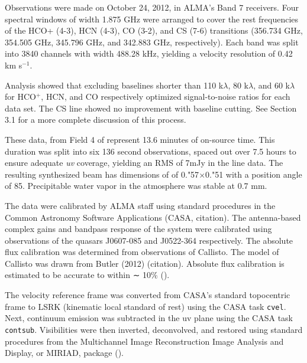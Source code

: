 Observations were made on October 24, 2012, in ALMA's Band 7 receivers. Four spectral windows of width 1.875 GHz were arranged to cover the rest frequencies of the HCO+ (4-3), HCN (4-3), CO (3-2), and CS (7-6) transitions (356.734 GHz, 354.505 GHz, 345.796 GHz, and 342.883 GHz, respectively). Each band was split into 3840 channels with width 488.28 kHz, yielding a velocity resolution of 0.42 km s$^{-1}$.

\bigskip


Analysis showed that excluding baselines shorter than 110 k$\lambda$, 80 k$\lambda$, and 60 k$\lambda$ for HCO$^{+}$, HCN, and CO respectively optimized signal-to-noise ratios for each data set. The CS line showed no improvement with baseline cutting. See Section 3.1 for a more complete discussion of this process.


These data, from Field 4 of \citet{mann_alma_2014} represent 13.6 minutes of on-source time. This duration was split into six 136 second observations, spaced out over 7.5 hours to ensure adequate \textit{uv} coverage, yielding an RMS of 7mJy in the line data. The resulting synthesized beam has dimensions of of 0."57$\times$0."51 with a position angle of 85\degree. Precipitable water vapor in the atmosphere was stable at 0.7 mm.


The data were calibrated by ALMA staff using standard procedures in the Common Astronomy Software Applications (CASA, citation). The antenna-based complex gains and bandpass response of the system were calibrated using observations of the quasars J0607-085 and J0522-364 respectively. The absolute flux calibration was determined from observations of Callisto. The model of Callisto was drawn from Butler (2012) (citation). Absolute flux calibration is estimated to be accurate to within ∼ 10\% (\citet{mann_alma_2014}).

The velocity reference frame was converted from CASA's standard topocentric frame to LSRK (kinematic local standard of rest) using the CASA task \texttt{cvel}. Next, continuum emission was subtracted in the uv plane using the CASA task \texttt{contsub}. Visibilities were then inverted, deconvolved, and restored using standard procedures from the Multichannel Image Reconstruction Image Analysis and Display, or MIRIAD, package (\citet{rj_sault_astronomical_1995}).





